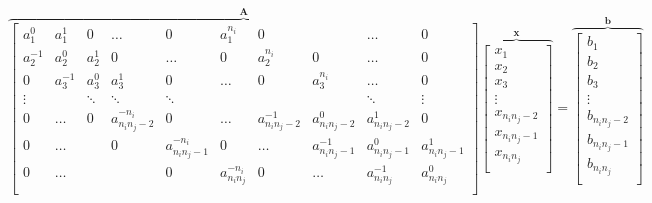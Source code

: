 \documentclass[final,5p]{elsarticle}
\numberwithin{equation}{section}
\begin{document}
    \begin{figure}
        \begin{equation}
            \overbrace{
            \begin{bmatrix}
                a^0_1    & a^1_1    & 0       & \ldots  & 0      & a^{n_i}_1   & 0       &         & \ldots    &  0      \\
                a^{-1}_2   & a^0_2    & a^1_2 & 0       & \ldots & 0         & a^{n_i}_2 & 0       & \ldots    &  0      \\
                0          & a^{-1}_3   & a^0_3 & a^1_3 & 0      & \ldots    & 0       & a^{n_i}_3 & \ldots    & 0       \\
                \vdots     &            & \ddots  & \ddots  & \ddots &           &         &         & \ddots    & \vdots  \\
                0          & \ldots     & 0      & a^{-n_i}_{n_in_j-2}  & 0       & \ldots  & a^{-1}_{n_in_j-2}  & a^0_{n_in_j-2} & a^1_{n_in_j-2} & 0 \\
                0          & \ldots     &         & 0      & a^{-n_i}_{n_in_j-1}  & 0       & \ldots  & a^{-1}_{n_in_j-1}  & a^0_{n_in_j-1} & a^1_{n_in_j-1} \\
                0          & \ldots     &         &         & 0      & a^{-n_i}_{n_in_j}  & 0       & \ldots  & a^{-1}_{n_in_j}  & a^0_{n_in_j} \\
            \end{bmatrix}}^\textbf{A}
            \overbrace{
            \begin{bmatrix}
                x_1 \\
                x_2 \\
                x_3 \\
                \vdots \\
                x_{n_in_j-2} \\
                x_{n_in_j-1} \\
                x_{n_in_j} \\
            \end{bmatrix}}^\textbf{x}
            =
            \overbrace{
            \begin{bmatrix}
                b_1 \\
                b_2 \\
                b_3 \\
                \vdots \\
                b_{n_in_j-2} \\
                b_{n_in_j-1} \\
                b_{n_in_j} \\
            \end{bmatrix}}^\textbf{b}
            \label{eq:sistema}
        \end{equation}
    \end{figure}
\end{document}
